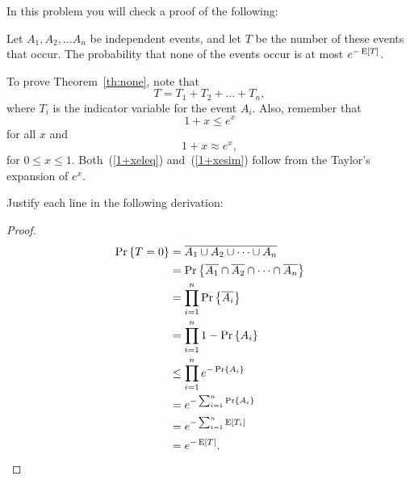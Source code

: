 \documentclass[10pt]{article}
\begin{document}


\begin{problem}
In this problem you will check a proof of the following:
\begin{theorem}\label{th:none}
Let $A_1, A_2, \dots A_n$ be independent events, and let $T$ be the
number of these events that occur.  The probability that none of the
events occur is at most $e^{-\mathop{\textup{E}}\nolimits\left[T\right]}$.
\end{theorem}

To prove Theorem~\ref{th:none}, note that
\begin{equation}\label{Tsum}
T = T_1 + T_2 + \dots + T_n,
\end{equation}
where $T_i$ is the indicator variable for the event $A_i$.  Also, remember
that
\begin{equation} \label{1+xeleq}
1 + x \leq e^x
\end{equation}
for all $x$ and
\begin{equation}
1 + x \approx e^x \label{1+xesim},
\end{equation}
for $0 \leq x \leq 1$.  Both~(\ref{1+xeleq}) and~(\ref{1+xesim}) follow
from the Taylor's expansion of $e^x$.

\bparts

\ppart
Justify each line in the following derivation:

\begin{proof}
\begin{align*}
\mathop{\textup{Pr}}\nolimits\left\{T = 0\right\}
  & = \overline{A_1 \cup A_2 \cup \cdots \cup A_n}\\
  & =  \mathop{\textup{Pr}}\nolimits\left\{\overline{A_1} \cap \overline{A_2} \cap \dots \cap \overline{A_n}\right\}\\
  & =  \prod_{i=1}^n \mathop{\textup{Pr}}\nolimits\left\{\overline{A_i}\right\}\\
  & =  \prod_{i=1}^n 1 - \mathop{\textup{Pr}}\nolimits\left\{A_i\right\}\\
  & \leq  \prod_{i=1}^n e^{-\mathop{\textup{Pr}}\nolimits\left\{A_i\right\}}\\
  & =  e^{-\sum_{i=1}^n \mathop{\textup{Pr}}\nolimits\left\{A_i\right\}}\\
  & =  e^{-\sum_{i=1}^n \mathop{\textup{E}}\nolimits\left[T_i\right]}\\
  & =  e^{-\mathop{\textup{E}}\nolimits\left[T\right]}.
\end{align*}
\end{proof}


\end{problem}
\end{document}
